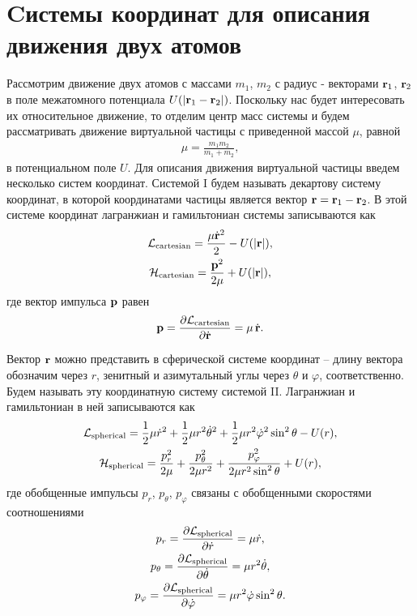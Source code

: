 \section{Cистемы координат для описания движения двух атомов}

Рассмотрим движение двух атомов с массами $m_1$, $m_2$ с радиус - векторами $\mathbf{r}_1$, $\mathbf{r}_2$ в поле межатомного потенциала $U(\vert \mathbf{r}_1 - \mathbf{r}_2 \vert)$. Поскольку нас будет интересовать их относительное движение, то отделим центр масс системы и будем рассматривать движение виртуальной частицы с приведенной массой $\mu$, равной
\begin{gather}
    \mu = \frac{m_1 m_2}{m_1 + m_2}, 
\end{gather}
%
в потенциальном поле $U$. Для описания движения виртуальной частицы введем несколько систем координат. Системой I будем называть декартову систему координат, в которой координатами частицы является вектор $\mathbf{r} = \mathbf{r}_1 - \mathbf{r}_2$. В этой системе координат лагранжиан и гамильтониан системы записываются как 
\begin{gather}
    \mathcal{L}_\text{cartesian} = \frac{\mu \dot{\mathbf{r}}^2}{2} - U( \vert \mathbf{r} \vert ), \label{two-atom-cartesian-lagrangian} \\
    \mathcal{H}_\text{cartesian} = \frac{\mathbf{p}^2}{2\mu} + U( \vert \mathbf{r} \vert ), \label{two-atom-cartesian-hamiltonian}
\end{gather}
%
где вектор импульса $\mathbf{p}$ равен
\begin{gather}
    \mathbf{p} = \frac{\partial \mathcal{L}_\text{cartesian}}{\partial \dot{\mathbf{r}}} = \mu \, \dot{\mathbf{r}}. \label{two-atom-cartesian-momenta}
\end{gather}

Вектор $\mathbf{r}$ можно представить в сферической системе координат -- длину вектора обозначим через $r$, зенитный и азимутальный углы через $\theta$ и $\varphi$, соответственно. Будем называть эту координатную систему системой II. Лагранжиан и гамильтониан в ней записываются как
\begin{gather}
    \mathcal{L}_\text{spherical} = \frac{1}{2} \mu \dot{r}^2 + \frac{1}{2} \mu r^2 \dot{\theta}^2 + \frac{1}{2} \mu r^2 \dot{\varphi}^2 \sin^2 \theta - U(r),  \label{two-atom-spherical-lagrangian} \\
    \mathcal{H}_\text{spherical} = \frac{p_r^2}{2 \mu} + \frac{p_\theta^2}{2 \mu r^2} + \frac{p_\varphi^2}{2 \mu r^2 \sin^2 \theta} + U(r), \label{two-atom-spherical-hamiltonian}
\end{gather}
%
где обобщенные импульсы $p_r$, $p_\theta$, $p_\varphi$ связаны с обобщенными скоростями соотношениями
\begin{gather}
    p_r = \frac{\partial \mathcal{L}_\text{spherical}}{\partial \dot{r}} = \mu \dot{r}, \\
    p_\theta = \frac{\partial \mathcal{L}_\text{spherical}}{\partial \dot{\theta}} = \mu r^2 \dot{\theta}, \\
    p_\varphi = \frac{\partial \mathcal{L}_\text{spherical}}{\partial \dot{\varphi}} = \mu r^2 \dot{\varphi} \sin^2 \theta.
\end{gather}

